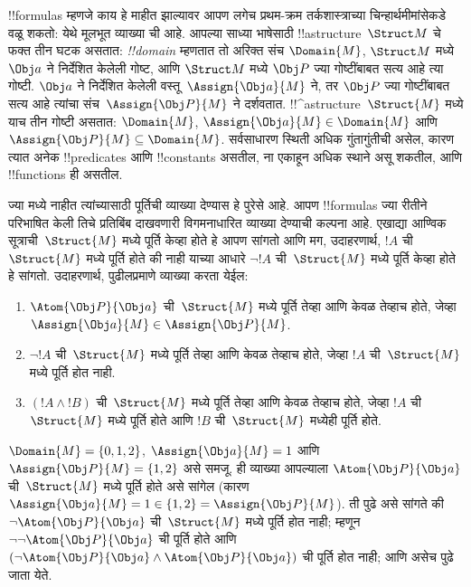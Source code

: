 \documentclass[../../../include/open-logic-section]{subfiles}
\begin{document}


!!{formula}s म्हणजे काय हे माहीत झाल्यावर आपण लगेच प्रथम-क्रम
तर्कशास्त्राच्या चिन्हार्थमीमांसेकडे वळू शकतो: येथे मूलभूत व्याख्या
ची आहे. आपल्या साध्या भाषेसाठी !!a{structure}~$\Struct M$
चे फक्त तीन घटक असतात: \emph{!!{domain}} म्हणतात तो अरिक्त संच
$\Domain{M}$, $\Struct M$ मध्ये $\Obj a$ ने निर्देशित केलेली गोष्ट, आणि
$\Struct M$ मध्ये $\Obj P$ ज्या गोष्टींबाबत सत्य आहे त्या गोष्टी.
$\Obj a$ ने निर्देशित केलेली वस्तू~$\Assign{\Obj a}{M}$ ने, तर
$\Obj P$ ज्या गोष्टींबाबत सत्य आहे त्यांचा संच~$\Assign{\Obj P}{M}$ ने
दर्शवतात. !!^a{structure}~$\Struct{M}$ मध्ये याच तीन गोष्टी असतात:
$\Domain{M}$, $\Assign{\Obj a}{M} \in \Domain{M}$ आणि
$\Assign{\Obj P}{M} \subseteq \Domain{M}$. सर्वसाधारण स्थिती अधिक
गुंतागुंतीची असेल, कारण त्यात अनेक !!{predicate}s आणि !!{constant}s
असतील, ना एकाहून अधिक स्थाने असू शकतील, आणि
!!{function}s ही असतील.

ज्या मध्ये नाहीत त्यांच्यासाठी पूर्तिची
व्याख्या देण्यास हे पुरेसे आहे. आपण !!{formula}s ज्या रीतीने परिभाषित
केली तिचे प्रतिबिंब दाखवणारी विगमनाधारित व्याख्या देण्याची कल्पना आहे.
एखाद्या आण्विक सूत्राची~$\Struct{M}$ मध्ये पूर्ति केव्हा होते हे आपण
सांगतो आणि मग, उदाहरणार्थ, $!A$ ची~$\Struct{M}$ मध्ये पूर्ति होते की
नाही याच्या आधारे $\lnot !A$ ची~$\Struct{M}$ मध्ये पूर्ति केव्हा होते
हे सांगतो. उदाहरणार्थ, पुढीलप्रमाणे व्याख्या करता येईल:
\begin{enumerate}
  \item $\Atom{\Obj P}{\Obj a}$ ची~$\Struct{M}$ मध्ये पूर्ति तेव्हा आणि
  केवळ तेव्हाच होते, जेव्हा $\Assign{\Obj a}{M} \in \Assign{\Obj P}{M}$.
  \item $\lnot !A$ ची~$\Struct{M}$ मध्ये पूर्ति तेव्हा आणि केवळ तेव्हाच
  होते, जेव्हा $!A$ ची~$\Struct{M}$ मध्ये पूर्ति होत नाही.
  \item $(!A \land !B)$ ची~$\Struct{M}$ मध्ये पूर्ति तेव्हा आणि केवळ
  तेव्हाच होते, जेव्हा $!A$ ची~$\Struct{M}$ मध्ये पूर्ति होते आणि
  $!B$ ची~$\Struct{M}$ मध्येही पूर्ति होते.
\end{enumerate}
$\Domain{M} = \{0, 1, 2\}$, $\Assign{\Obj a}{M} = 1$ आणि
$\Assign{\Obj P}{M} = \{1, 2\}$ असे समजू. ही व्याख्या आपल्याला
$\Atom{\Obj P}{\Obj a}$ ची~$\Struct{M}$ मध्ये पूर्ति होते असे सांगेल
(कारण $\Assign{\Obj a}{M} =  1 \in \{1,2\} = \Assign{\Obj P}{M}$).
ती पुढे असे सांगते की $\lnot \Atom{\Obj P}{\Obj a}$ ची~$\Struct{M}$
मध्ये पूर्ति होत नाही; म्हणून $\lnot\lnot \Atom{\Obj P}{\Obj a}$ ची
पूर्ति होते आणि $(\lnot \Atom{\Obj P}{\Obj a} \land \Atom{\Obj P}{\Obj a})$
ची पूर्ति होत नाही; आणि असेच पुढे जाता येते.
\end{document}
